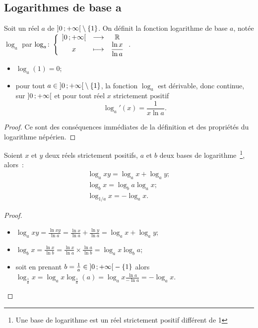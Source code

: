 \subsection{Logarithmes de base a}
\label{subsec:chap1-loga}
\begin{defdef}
  Soit un réel $a$ de $\left] 0 \, ;  +\infty \right[\setminus\{1\}$. On définit la fonction logarithme de base  $a$, notée $\log_a$ par $\log_a\colon \left\{\begin{array}{ccc} \left] 0 \, ;  +\infty \right[ & \longrightarrow &\mathbb{R}\\ x & \longmapsto & \dfrac{\ln x}{\ln a} \end{array} \right.$.
\end{defdef}
%
\begin{prop}
  \begin{itemize}
  \item $\log_a(1)=0$;
  \item pour tout $a \in\left] 0 \, ;  +\infty \right[\setminus\{1\}$, la fonction $\log_a$ est dérivable, donc continue, sur $\left] 0 \, ;  +\infty \right[$ et pour tout réel $x$ strictement positif
    \begin{equation}
      \log_a'(x)=\frac{1}{x \ln a}.
    \end{equation}
  \end{itemize}
\end{prop}
\begin{proof}
  Ce sont des conséquences immédiates de la définition et des propriétés du logarithme népérien.
\end{proof}
%
\begin{prop}
  Soient $x$ et $y$ deux réels strictement positifs, $a$ et $b$ deux bases de logarithme~\footnote{Une base de logarithme est un réel strictement positif différent de 1}, alors~:
  \begin{gather}
    \log_a xy=\log_a x + \log_a y; \\
    \log_b x=\log_ba \log_ax; \\
    \log_{1/a} x=-\log_a x.
  \end{gather}
\end{prop}
\begin{proof}
  \begin{itemize}
  \item $\log_a xy= \frac{\ln xy}{\ln a}= \frac{\ln x}{\ln a} +\frac{\ln y}{\ln a}=\log_ax+\log_ay$;
  \item $\log_b x = \frac{\ln x}{\ln b}=\frac{\ln x}{\ln a} \times \frac{\ln a}{\ln b}=\log_ax \log_ba$;
  \item soit en prenant $b=\frac{1}{a} \in \left] 0 \, ;  +\infty \right[-\{1\}$ alors $\log_{\frac{1}{a}}x=\log_ax \log_{\frac{1}{a}}(a)=\log_ax \frac{\ln a}{-\ln a}=-\log_ax$.
  \end{itemize}
\end{proof}
